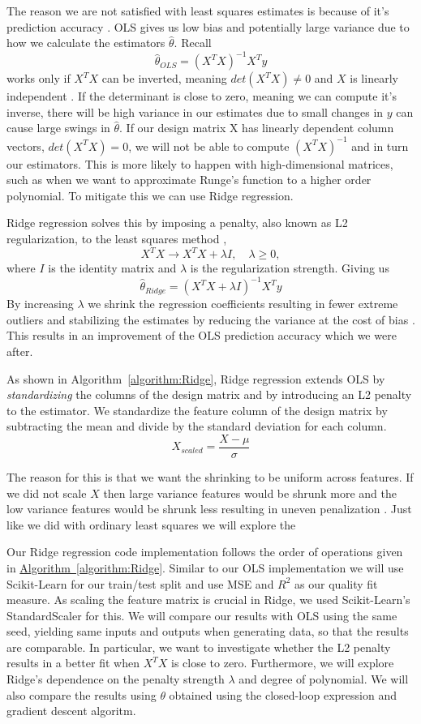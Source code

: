 \documentclass[amssymb,twocolumn,aps]{revtex4}
\begin{document}
The reason we are not satisfied with least squares estimates is because of it's prediction accuracy \cite{fysml2}. OLS gives us low bias and potentially large variance due to how we calculate the estimators $\hat{\theta}$. Recall
$$\hat{\theta}_{OLS} = (X^TX)^{-1}X^Ty$$
works only if $X^TX$ can be inverted, meaning $det(X^TX) \neq 0$ and $X$ is linearly independent \cite{fysml2}. If the determinant is close to zero, meaning we can compute it's inverse, there will be high variance in our estimates due to small changes in $y$ can cause large swings in $\hat{\theta}$. If our design matrix X has linearly dependent column vectors, $det(X^TX) = 0$, we will not be able to compute $(X^TX)^{-1}$ and in turn our estimators. This is more likely to happen with high-dimensional matrices, such as when we want to approximate Runge's function to a higher order polynomial. To mitigate this we can use Ridge regression.

Ridge regression solves this by imposing a penalty, also known as L2 regularization, to the least squares method \cite{fysml2},
$$X^TX \to X^TX+\lambda I,\quad \lambda \geq 0,$$
where $I$ is the identity matrix and $\lambda$ is the regularization strength. Giving us
$$\hat{\theta}_{Ridge} = (X^TX+\lambda I)^{-1}X^Ty$$
By increasing $\lambda$ we shrink the regression coefficients resulting in fewer extreme outliers and stabilizing the estimates by reducing the variance at the cost of bias \cite{elestat1}. This results in an improvement of the OLS prediction accuracy which we were after.

As shown in Algorithm~\ref{algorithm:Ridge}, Ridge regression extends OLS by \textit{standardizing} the columns of the design matrix and by introducing an L2 penalty to the estimator. We standardize the feature column of the design matrix by subtracting the mean and divide by the standard deviation for each column. 
$$X_{scaled} = \frac{X-\mu}{\sigma}$$

The reason for this is that we want the shrinking to be uniform across features. If we did not scale $X$ then large variance features would be shrunk more and the low variance features would be shrunk less  resulting in uneven penalization \cite{introstat1}. Just like we did with ordinary least squares we will explore the 

Our Ridge regression code implementation follows the order of operations given in \hyperref[algorithm:Ridge]{Algorithm~\autoref{algorithm:Ridge}}. Similar to our OLS implementation we will use Scikit-Learn for our train/test split and use MSE and $R^2$ as our quality fit measure. As scaling the feature matrix is crucial in Ridge, we used Scikit-Learn's StandardScaler for this. We will compare our results with OLS using the same seed, yielding same inputs and outputs when generating data, so that the results are comparable. In particular, we want to investigate whether the L2 penalty results in a better fit when $X^TX$ is close to zero. Furthermore, we will explore Ridge's dependence on the penalty strength $\lambda$ and degree of polynomial. We will also compare the results using $\theta$ obtained using the closed-loop expression and gradient descent algoritm.
\end{document}
